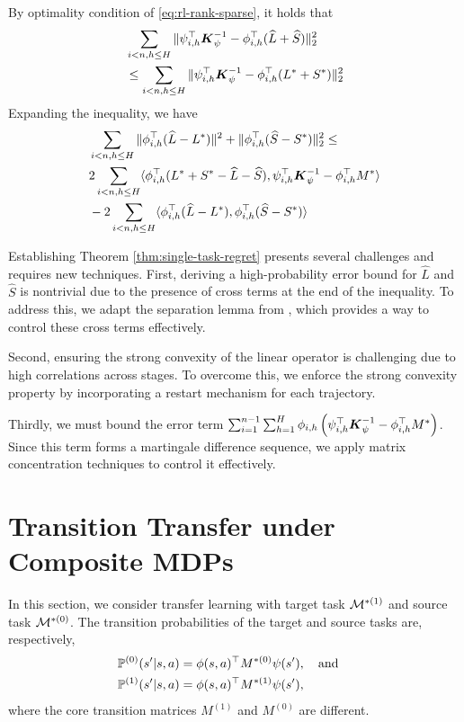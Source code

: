 By optimality condition of \eqref{eq:rl-rank-sparse}, it holds that
\begin{align*}&\sum_{i < n, h \leq H} \| \psi_{i,h}^\top \boldsymbol{K}_{\psi}^{-1} -\phi_{i,h}^\top (\widehat L + \widehat S) \|_2^2 \\&\le \sum_{i < n, h \leq H} \| \psi_{i,h}^\top \boldsymbol{K}_{\psi}^{-1} -\phi_{i,h}^\top (L^* + S^*) \|_2^2\end{align*}
Expanding the inequality, we have
\begin{align*}&\sum_{i < n, h \leq H} \| \phi_{i,h}^\top (\widehat L-L^*)\|^2+\|\phi_{i,h}^\top (\widehat S-S^*) \|_2^2\le \\&2\sum_{i < n, h \leq H} \langle \phi_{i,h}^\top (L^* + S^*-\widehat L - \widehat S) ,\psi_{i,h}^\top \boldsymbol{K}_{\psi}^{-1} -\phi_{i,h}^\top M^*\rangle\\&-2\sum_{i < n, h \leq H}\langle\phi_{i,h}^\top (\widehat L-L^*),\phi_{i,h}^\top (\widehat S-S^*)\rangle\end{align*}

Establishing Theorem \ref{thm:single-task-regret} presents several challenges and requires new techniques.
First, deriving a high-probability error bound for $\hat L$ and $\hat S$ is nontrivial due to the presence of cross terms at the end of the inequality. To address this, we adapt the separation lemma from \cite{chai2024structured}, which provides a way to control these cross terms effectively.

Second, ensuring the strong convexity of the linear operator is challenging due to high correlations across stages. To overcome this, we enforce the strong convexity property by incorporating a restart mechanism for each trajectory.

Thirdly, we must bound the error term $\sum_{i=1}^{n-1}\sum_{h=1}^H \phi_{i,h}\left(\psi_{i,h}^\top \boldsymbol{K}_{\psi}^{-1}-\phi_{i,h}^\top   M^*\right)$. Since this term forms a martingale difference sequence, we apply matrix concentration techniques to control it effectively.

\section{Transition Transfer under Composite MDPs}\label{sec:transfer}

In this section, we consider transfer learning with target task ${\cal M}^{*(1)}$ and source task ${\cal M}^{*(0)}$. 
The transition probabilities of the target and source tasks are, respectively,
\begin{equation} \label{eqn:composite-MDP2}
\begin{aligned}
\mathbb{P}^{(0)}(s' | s, a) &= \phi(s, a)^\top   M^{*(0)} \psi(s'), \quad\text{and}\quad \\
\mathbb{P}^{(1)}(s' | s, a) &= \phi(s, a)^\top  M^{*(1)}  \psi(s'),   
\end{aligned}
\end{equation}
where the core transition matrices $M^{(1)}$ and $M^{(0)}$ are different. 

